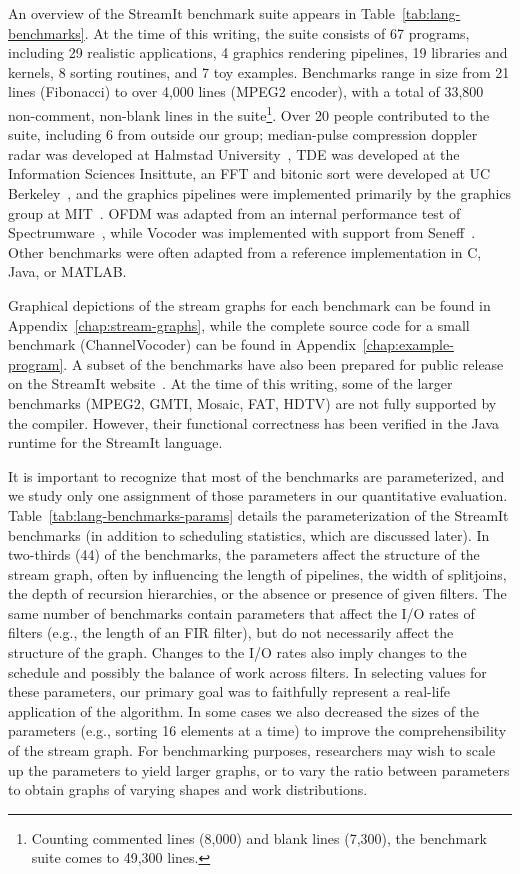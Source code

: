 An overview of the StreamIt benchmark suite appears in
Table~\ref{tab:lang-benchmarks}.  At the time of this writing, the
suite consists of 67 programs, including 29 realistic applications, 4
graphics rendering pipelines, 19 libraries and kernels, 8 sorting
routines, and 7 toy examples.  Benchmarks range in size from 21 lines
(Fibonacci) to over 4,000 lines (MPEG2 encoder), with a total of
33,800 non-comment, non-blank lines in the suite\footnote{Counting
commented lines (8,000) and blank lines (7,300), the benchmark suite
comes to 49,300 lines.}.  Over 20 people contributed to the suite,
including 6 from outside our group; median-pulse compression doppler
radar was developed at Halmstad University~\cite{ola-techrep}, TDE was
developed at the Information Sciences Insittute, an FFT and bitonic
sort were developed at UC Berkeley~\cite{mani-permutations}, and the
graphics pipelines were implemented primarily by the graphics group at
MIT~\cite{chen-graphics05}.  OFDM was adapted from an internal
performance test of Spectrumware~\cite{tennenhouse_spectrumware_1996},
while Vocoder was implemented with support from
Seneff~\cite{seneff80thesis}.  Other benchmarks were often adapted
from a reference implementation in C, Java, or MATLAB.

Graphical depictions of the stream graphs for each benchmark can be
found in Appendix~\ref{chap:stream-graphs}, while the complete source
code for a small benchmark (ChannelVocoder) can be found in
Appendix~\ref{chap:example-program}.  A subset of the benchmarks have
also been prepared for public release on the StreamIt
website~\cite{streamitweb}.  At the time of this writing, some of the
larger benchmarks (MPEG2, GMTI, Mosaic, FAT, HDTV) are not fully
supported by the compiler.  However, their functional correctness has
been verified in the Java runtime for the StreamIt language.

It is important to recognize that most of the benchmarks are
parameterized, and we study only one assignment of those parameters in
our quantitative evaluation.  Table~\ref{tab:lang-benchmarks-params}
details the parameterization of the StreamIt benchmarks (in addition
to scheduling statistics, which are discussed later).  In two-thirds
(44) of the benchmarks, the parameters affect the structure of the
stream graph, often by influencing the length of pipelines, the width
of splitjoins, the depth of recursion hierarchies, or the absence or
presence of given filters.  The same number of benchmarks contain
parameters that affect the I/O rates of filters (e.g., the length of
an FIR filter), but do not necessarily affect the structure of the
graph.  Changes to the I/O rates also imply changes to the schedule
and possibly the balance of work across filters.  In selecting values
for these parameters, our primary goal was to faithfully represent a
real-life application of the algorithm.  In some cases we also
decreased the sizes of the parameters (e.g., sorting 16 elements at a
time) to improve the comprehensibility of the stream graph.  For
benchmarking purposes, researchers may wish to scale up the parameters
to yield larger graphs, or to vary the ratio between parameters to
obtain graphs of varying shapes and work distributions.


